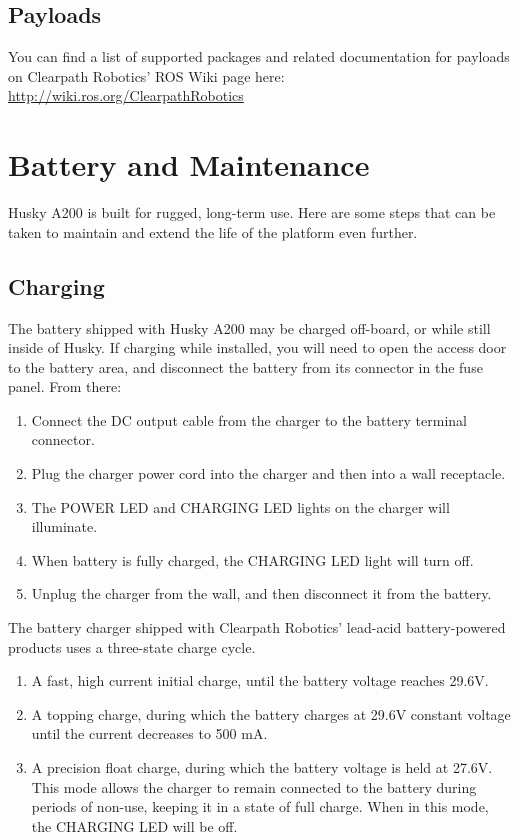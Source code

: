 \documentclass[]{clearpath-latex/clearpath-manual}
\begin{document}
\subsection{Payloads}
You can find a list of supported packages and related documentation for payloads on Clearpath Robotics’
ROS Wiki page here: \url{http://wiki.ros.org/ClearpathRobotics}
\newpage

\section{Battery and Maintenance}
Husky A200 is built for rugged, long-term use. Here are some steps that can be
taken to maintain and extend the life of the platform even further.

\subsection{Charging}
The battery shipped with Husky A200 may be charged off-board, or while still inside of Husky.
If charging while installed, you will need to open the access door to the battery area, and
disconnect the battery from its connector in the fuse panel. From there:

\begin{enumerate}
	\item Connect the DC output cable from the charger to the battery terminal connector.
	\item Plug the charger power cord into the charger and then into a wall receptacle.
	\item The POWER LED and CHARGING LED lights on the charger will illuminate.
	\item When battery is fully charged, the CHARGING LED light will turn off.
	\item Unplug the charger from the wall, and then disconnect it from the battery.
\end{enumerate}

The battery charger shipped with Clearpath Robotics’ lead-acid
battery-powered products uses a three-state charge cycle.

\begin{enumerate}
		\item A fast, high current initial charge, until the battery voltage reaches 29.6V.
		\item A topping charge, during which the battery charges at 29.6V constant voltage
		until the current decreases to 500 mA.
		\item A precision float charge, during which the battery voltage is held at 27.6V.
		This mode allows the charger to remain connected to the battery during periods of non-use,
		keeping it in a state of full charge. When in this mode, the CHARGING LED will be off.
\end{enumerate}
\end{document}
